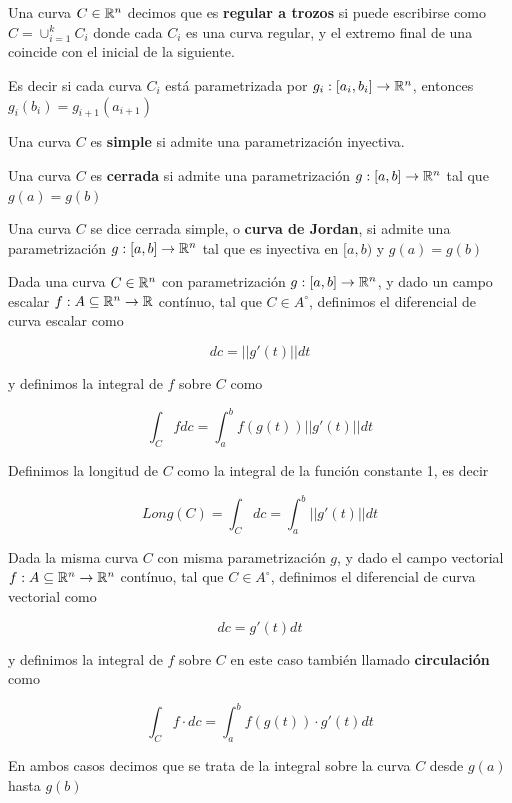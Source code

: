 \begin{definition}[Jordan]
Una curva $C \in \mathbb{R}^n$ decimos que es \textbf{regular a trozos} si puede escribirse como $\displaystyle C = \cup_{i=1}^k C_i$ donde cada $C_i$ es una curva regular, y el extremo final de una coincide con el inicial de la siguiente.

Es decir si cada curva $C_i$ está parametrizada por $g_i : [a_i, b_i] \to \mathbb{R}^n$, entonces $g_i(b_i) = g_{i+1}(a_{i+1})$

Una curva $C$ es \textbf{simple}  si admite una parametrización inyectiva.

Una curva $C$ es \textbf{cerrada}  si admite una parametrización $g:[a,b] \to \mathbb{R}^n$ tal que $g(a) = g(b)$

Una curva $C$ se dice cerrada simple, o \textbf{curva de Jordan},  si admite una parametrización $ g:[a,b] \to \mathbb{R}^n$ tal que es inyectiva en $ [a,b)$ y $ g(a) = g(b)$
\end{definition}

\begin{definition} 
Dada una curva $C \in \mathbb{R}^n$ con parametrización $ g:[a,b] \to \mathbb{R}^n$, y dado un campo escalar $f : A \subseteq \mathbb{R}^n \to \mathbb{R}$ contínuo, tal que $C \in A^{\circ}$, definimos el diferencial de curva escalar como

$$ dc = || g'(t) || dt $$

y definimos la integral de $f$ sobre $C$ como

$$ \int_C f dc = \int_a^b f(g(t)) || g'(t) || dt $$

Definimos la longitud de $C$ como la integral de la función constante 1, es decir

$$ Long(C) = \int_C dc = \int_a^b || g'(t) || dt $$

Dada la misma curva $C$ con misma parametrización $g$, y dado el campo vectorial $f : A \subseteq \mathbb{R}^n \to \mathbb{R}^n$ contínuo, tal que $C \in A^{\circ}$, definimos el diferencial de curva vectorial como

$$ dc = g'(t) dt $$

y definimos la integral de $f$ sobre $C$ en este caso también llamado \textbf{circulación} como

$$ \int_C f \cdot dc = \int_a^b f(g(t)) \cdot g'(t) dt$$

En ambos casos decimos que se trata de la integral sobre la curva $C$ desde $g(a)$ hasta $g(b)$
\end{definition}

